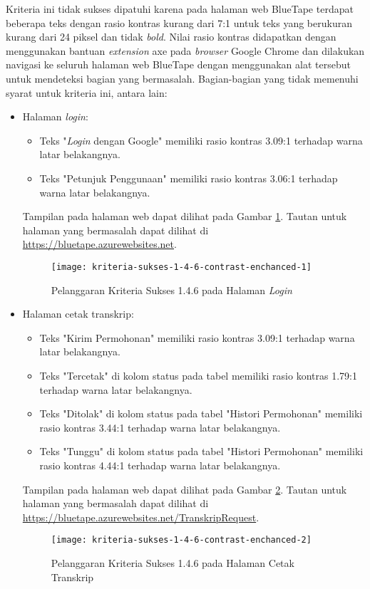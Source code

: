 Kriteria ini tidak sukses dipatuhi karena pada halaman web BlueTape terdapat beberapa teks dengan rasio kontras kurang dari 7:1 untuk teks yang berukuran kurang dari 24 piksel dan tidak \textit{bold}. Nilai rasio kontras didapatkan dengan menggunakan bantuan \textit{extension} axe pada \textit{browser} Google Chrome dan dilakukan navigasi ke seluruh halaman web BlueTape dengan menggunakan alat tersebut untuk mendeteksi bagian yang bermasalah. Bagian-bagian yang tidak memenuhi syarat untuk kriteria ini, antara lain:

\begin{itemize}
    \item Halaman \textit{login}: 
    \begin{itemize}
        \item Teks "\textit{Login} dengan Google" memiliki rasio kontras 3.09:1 terhadap warna latar belakangnya.
        \item Teks "Petunjuk Penggunaan" memiliki rasio kontras 3.06:1 terhadap warna latar belakangnya.
    \end{itemize}
    Tampilan pada halaman web dapat dilihat pada Gambar \ref{fig:1.4.6_contrast_enchanced_1}. Tautan untuk halaman yang bermasalah dapat dilihat di \url{https://bluetape.azurewebsites.net}.
    \begin{figure}[H]
        \centering  
        \texttt{[image: kriteria-sukses-1-4-6-contrast-enchanced-1]}  
        \caption[Pelanggaran Kriteria Sukses 1.4.6 pada Halaman \textit{Login}]{Pelanggaran Kriteria Sukses 1.4.6 pada Halaman \textit{Login}}
        \label{fig:1.4.6_contrast_enchanced_1}  
    \end{figure} 

    \item Halaman cetak transkrip: 
    \begin{itemize}
        \item Teks "Kirim Permohonan" memiliki rasio kontras 3.09:1 terhadap warna latar belakangnya.
        \item Teks "Tercetak" di kolom status pada tabel memiliki rasio kontras 1.79:1 terhadap warna latar belakangnya.
        \item Teks "Ditolak" di kolom status pada tabel "Histori Permohonan" memiliki rasio kontras 3.44:1 terhadap warna latar belakangnya.
        \item Teks "Tunggu" di kolom status pada tabel "Histori Permohonan" memiliki rasio kontras 4.44:1 terhadap warna latar belakangnya.
    \end{itemize}
    Tampilan pada halaman web dapat dilihat pada Gambar \ref{fig:1.4.6_contrast_enchanced_2}. Tautan untuk halaman yang bermasalah dapat dilihat di \url{https://bluetape.azurewebsites.net/TranskripRequest}.
    \begin{figure}[H]
        \centering  
        \texttt{[image: kriteria-sukses-1-4-6-contrast-enchanced-2]}  
        \caption[Pelanggaran Kriteria Sukses 1.4.6 pada Halaman Cetak Transkrip]{Pelanggaran Kriteria Sukses 1.4.6 pada Halaman Cetak Transkrip}
        \label{fig:1.4.6_contrast_enchanced_2}  
    \end{figure} 
    

\end{itemize}
